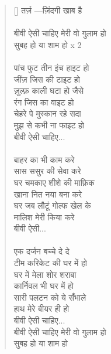 \begin{verse}[\versewidth]\texthindi{
तर्ज़ —ज़िंदगी खाब है \\
\\
बीवी ऐसी चाहिए मेरी वो गुलाम हो\\
सुबह हो या शाम हो x 2\\
\\
पांच फुट तीन इंच हाइट हो\\
जींज़ जिस की टाइट हो\\
ज़ुल्फ़ काली घटा हो जैसे\\
रंग जिस का वाइट हो\\
चेहरे पे मुस्कान रहे सदा\\
मुझ से कभी ना फाइट हो\\
बीवी ऐसी चाहिए...\\
\\
बाहर का भी काम करे\\
सास ससुर की सेवा करे\\
घर चमकाए शीशे की माफ़िक\\
खाना नित नया बना करे\\
घर जब लौटूं गोल्फ खेल के\\
मालिश मेरी किया करे\\
बीवी ऐसी...\\
\\
एक दर्जन बच्चे दे दे\\
टीम करिकेट की घर में हो\\
घर में मेला शोर शराबा\\
कार्निवल भी घर में हो\\
सारी पलटन को ये सँभाले\\
हाथ मेरे बीयर ही हो\\
बीवी ऐसी चाहिए...\\
बीवी ऐसी चाहिए मेरी वो गुलाम हो\\
सुबह हो या शाम हो
}\end{verse}


